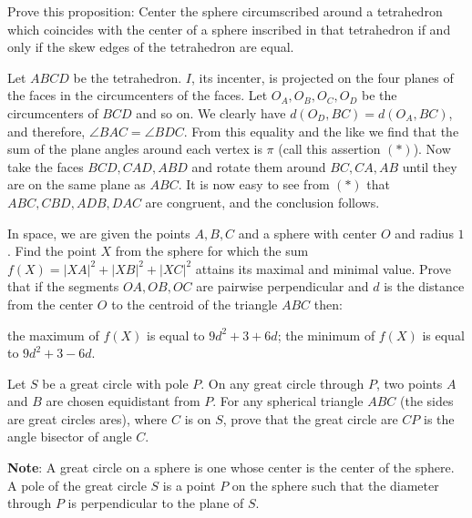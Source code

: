 \documentclass[12pt,a4paper]{memoir}
\theoremstyle{definition}
\begin{document}
\begin{question}[name={1967 IMO Longlist}]
	Prove this proposition: Center the sphere circumscribed around a tetrahedron which coincides with the center of a sphere inscribed in that tetrahedron if and only if the skew edges of the tetrahedron are equal.
\end{question}

\begin{solution}[name={Solution by Grobber}] 
	Let $ABCD$ be the tetrahedron. $I$, its incenter, is projected on the four planes of the faces in the circumcenters of the faces. Let $O_A,O_B,O_C,O_D$ be the circumcenters of $BCD$ and so on. We clearly have $d(O_D,BC)=d(O_A,BC)$, and therefore, $\angle BAC=\angle BDC$. From this equality and the like we find that the sum of the plane angles around each vertex is $\pi$ (call this assertion $(*)$). Now take the faces $BCD,CAD,ABD$ and rotate them around $BC,CA,AB$ until they are on the same plane as $ABC$. It is now easy to see from $(*)$ that $ABC,CBD,ADB,DAC$ are congruent, and the conclusion follows.
\end{solution}


\begin{question}[name={1970 Bulgaria}]
	In space, we are given the points $A,B,C$ and a sphere with center $O$ and radius $1$. Find the point $X$ from the sphere for which the sum $f(X)=|XA|^2+|XB|^2+|XC|^2$ attains its maximal and minimal value. Prove that if the segments $OA,OB,OC$ are pairwise perpendicular and $d$ is the distance from the center $O$ to the centroid of the triangle $ABC$ then:
	\begin{tasks}
		\task the maximum of $f(X)$ is equal to $9d^2+3+6d$;
		\task the minimum of $f(X)$ is equal to $9d^2+3-6d$.
	\end{tasks}
\end{question}	



\begin{question}[name={1979 USAMO}]
	Let $S$ be a great circle with pole $P$. On any great circle through $P$, two points $A$ and $B$ are chosen equidistant from $P$. For any spherical triangle $ABC$ (the sides are great circles ares), where $C$ is on $S$, prove that the great circle are $CP$ is the angle bisector of angle $C$.
	
	\textbf{Note}: A great circle on a sphere is one whose center is the center of the sphere. A pole of the great circle $S$ is a point $P$ on the sphere such that the diameter through $P$ is perpendicular to the plane of $S$.
\end{question}
\end{document}
